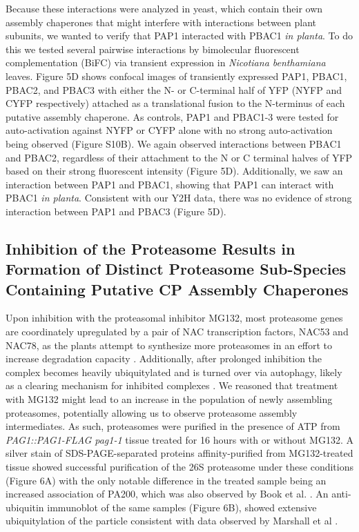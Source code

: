 Because these interactions were analyzed in yeast, which contain their own assembly chaperones that might interfere with interactions between plant subunits, we wanted to verify that PAP1 interacted with PBAC1 \textit{in planta}. To do this we tested several pairwise interactions by bimolecular fluorescent complementation (BiFC) via transient expression in \textit{Nicotiana benthamiana} leaves. Figure 5D shows confocal images of transiently expressed PAP1, PBAC1, PBAC2, and PBAC3 with either the N- or C-terminal half of YFP (NYFP and CYFP respectively) attached as a translational fusion to the N-terminus of each putative assembly chaperone. As controls, PAP1 and PBAC1-3 were tested for auto-activation against NYFP or CYFP alone with no strong auto-activation being observed (Figure S10B). We again observed interactions between PBAC1 and PBAC2, regardless of their attachment to the N or C terminal halves of YFP based on their strong fluorescent intensity (Figure 5D). Additionally, we saw an interaction between PAP1 and PBAC1, showing that PAP1 can interact with PBAC1 \textit{in planta}.  Consistent with our Y2H data, there was no evidence of strong interaction between PAP1 and PBAC3 (Figure 5D). 

\subsection{Inhibition of the Proteasome Results in Formation of Distinct Proteasome Sub-Species Containing Putative CP Assembly Chaperones}
Upon inhibition with the proteasomal inhibitor MG132, most proteasome genes are coordinately upregulated by a pair of NAC transcription factors, NAC53 and NAC78, as the plants attempt to synthesize more proteasomes in an effort to increase degradation capacity \citep{gladman16}. Additionally, after prolonged inhibition the complex becomes heavily ubiquitylated and is turned over via autophagy, likely as a clearing mechanism for inhibited complexes \citep{marshall15}. We reasoned that treatment with MG132 might lead to an increase in the population of newly assembling proteasomes, potentially allowing us to observe proteasome assembly intermediates. As such, proteasomes were purified in the presence of ATP from \textit{PAG1::PAG1-FLAG pag1-1} tissue treated for 16 hours with or without MG132. A silver stain of SDS-PAGE-separated proteins affinity-purified from MG132-treated tissue showed successful purification of the 26S proteasome under these conditions (Figure 6A) with the only notable difference in the treated sample being an increased association of PA200, which was also observed by Book et al. \citep{book10}. An anti-ubiquitin immunoblot of the same samples (Figure 6B), showed extensive ubiquitylation of the particle consistent with data observed by Marshall et al \citep{marshall15}.

